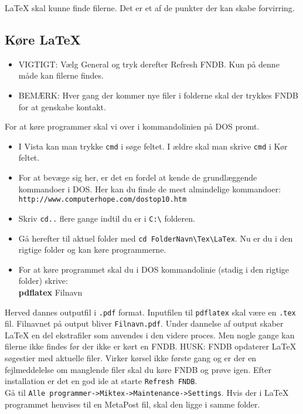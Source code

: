\documentclass{article}
\begin{document}
 \LaTeX{} skal kunne finde filerne. Det er et af de punkter der kan skabe forvirring.  

\subsection{Køre \LaTeX{}}
\begin{itemize}
\item VIGTIGT: Vælg General og tryk derefter Refresh FNDB. Kun på denne måde kan filerne findes.
\item BEMÆRK: Hver gang der kommer nye filer i folderne skal der trykkes FNDB for at genskabe kontakt.
\end{itemize}
For at køre programmer skal vi over i kommandolinien på DOS promt.
\begin{itemize}
\item I Vista kan man trykke \verb"cmd" i søge feltet. I ældre skal man skrive \verb"cmd" i Kør feltet.
\item For at bevæge sig her, er det en fordel at kende de grundlæggende kommandoer i DOS.
Her kan du finde de mest almindelige kommandoer:\\ \verb"http://www.computerhope.com/dostop10.htm"
\item Skriv \verb"cd.." flere gange indtil du er i \verb"C:\" folderen.
\item Gå herefter til aktuel folder med \verb"cd FolderNavn\Tex\LaTex".
Nu er du i den rigtige folder og kan køre programmerne.
\item For at køre programmet skal du i DOS kommandolinie (stadig i den rigtige folder) skrive:\\
\textbf{pdflatex} Filnavn 
\end{itemize}
Herved dannes outputfil i \verb".pdf" format.
Inputfilen til \verb"pdflatex" skal være en \verb".tex" fil. 
Filnavnet på output bliver \verb"Filnavn.pdf".
Under dannelse af output skaber \LaTeX{} en del ekstrafiler som anvendes i den videre proces. 
Men nogle gange kan filerne ikke findes før der ikke er kørt en FNDB. HUSK: FNDB opdaterer \LaTeX{} søgestier med aktuelle filer. 
Virker kørsel ikke første gang og er der en fejlmeddelelse om manglende filer skal du køre FNDB og prøve igen. Efter installation er det en god ide at starte \verb"Refresh FNDB".\\ Gå til \verb"Alle programmer->Miktex->Maintenance->Settings". 
Hvis der i \LaTeX{} programmet henvises til en MetaPost fil, skal den ligge i samme folder.
\end{document}
